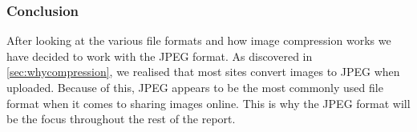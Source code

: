 \subsubsection*{Conclusion}
After looking at the various file formats and how image compression works we have decided to work with the JPEG format.
As discovered in \ref{sec:whycompression}, we realised that most sites convert images to JPEG when uploaded. 
Because of this, JPEG appears to be the most commonly used file format when it comes to sharing images online.
This is why the JPEG format will be the focus throughout the rest of the report.
